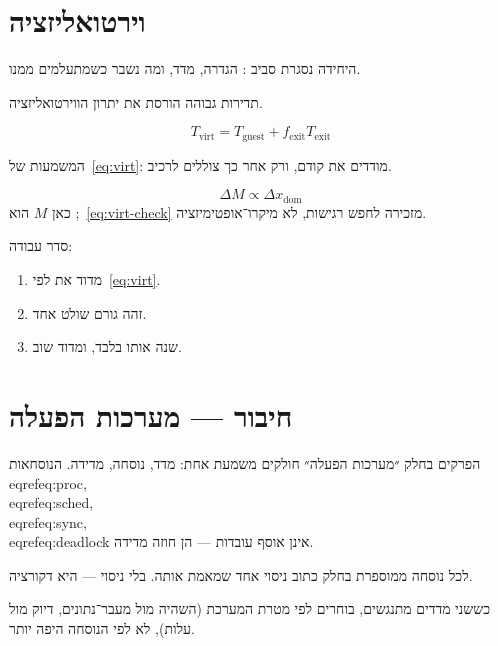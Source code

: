 \chapter{וירטואליזציה}
\label{ch:virt}

היחידה נסגרת סביב : הגדרה, מדד, ומה נשבר כשמתעלמים ממנו.

\begin{warnbox}[frametitle={מלכודת — וירטואליזציה}]
תדירות  גבוהה הורסת את יתרון הווירטואליזציה.
\end{warnbox}

\begin{equation}
\label{eq:virt}
T_{\mathrm{virt}}=T_{\mathrm{guest}}+f_{\mathrm{exit}}T_{\mathrm{exit}}
\end{equation}

המשמעות של~\eqref{eq:virt}: מודדים את  קודם, ורק אחר כך צוללים לרכיב.

\begin{equation}
\label{eq:virt-check}
\Delta M \propto \Delta x_{\mathrm{dom}}
\end{equation}
כאן $M$ הוא ;~\eqref{eq:virt-check} מזכירה לחפש רגישות, לא מיקרו־אופטימיזציה.

סדר עבודה:
\begin{enumerate}
\item[(\textbf{א})] מדוד את  לפי~\eqref{eq:virt}.
\item[(\textbf{ב})] זהה גורם שולט אחד.
\item[(\textbf{ג})] שנה אותו בלבד, ומדוד שוב.
\end{enumerate}


\chapter{חיבור — מערכות הפעלה}
\label{ch:bridge-proc}

הפרקים בחלק ״מערכות הפעלה״ חולקים משמעת אחת: מדד, נוסחה, מדידה.
הנוסחאות \\eqref{eq:proc}, \\eqref{eq:sched}, \\eqref{eq:sync}, \\eqref{eq:deadlock} אינן אוסף עובדות — הן חוזה מדידה.

\begin{keybox}[frametitle={חוזה החלק}]
לכל נוסחה ממוספרת בחלק כתוב ניסוי אחד שמאמת אותה. בלי ניסוי — היא דקורציה.
\end{keybox}

כששני מדדים מתנגשים, בוחרים לפי מטרת המערכת (השהיה מול מעבר־נתונים, דיוק מול עלות),
לא לפי הנוסחה היפה יותר.

